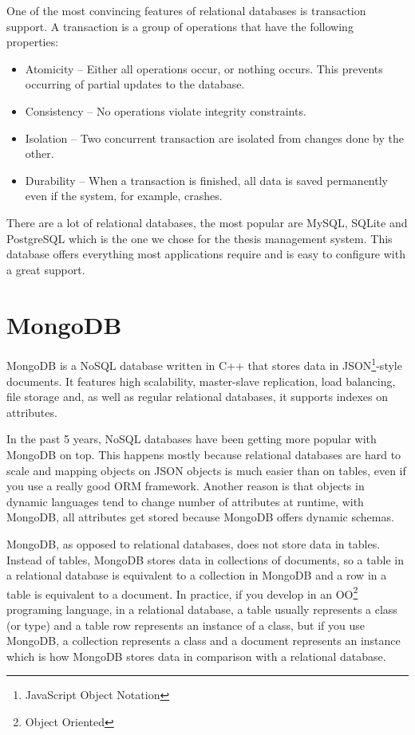 One of the most convincing features of relational databases is transaction support. A transaction is a group of operations that have the following properties:

\begin{itemize}
    \item Atomicity -- Either all operations occur, or nothing occurs. This prevents occurring of partial updates to the database.
    \item Consistency -- No operations violate integrity constraints.
    \item Isolation -- Two concurrent transaction are isolated from changes done by the other.
    \item Durability -- When a transaction is finished, all data is saved permanently even if the system, for example, crashes.
\end{itemize}

There are a lot of relational databases, the most popular are MySQL, SQLite and PostgreSQL which is the one we chose for the thesis management system. This database offers everything most applications require and is easy to configure with a great support.

\section{MongoDB}

MongoDB is a NoSQL database written in C++\cite{mongodb-homepage} that stores data in JSON\footnote{JavaScript Object Notation}-style documents. It features high scalability, master-slave replication, load balancing, file storage and, as well as regular relational databases, it supports indexes on attributes. 

In the past 5 years, NoSQL databases have been getting more popular with MongoDB on top\cite{db-ranking}. This happens mostly because relational databases are hard to scale and mapping objects on JSON objects is much easier than on tables, even if you use a really good ORM framework. Another reason is that objects in dynamic languages tend to change number of attributes at runtime, with MongoDB, all attributes get stored because MongoDB offers dynamic schemas.

MongoDB, as opposed to relational databases, does not store data in tables. Instead of tables, MongoDB stores data in collections of documents, so a table in a relational database is equivalent to a collection in MongoDB and a row in a table is equivalent to a document. In practice, if you develop in an OO\footnote{Object Oriented} programing language, in a relational database, a table usually represents a class (or type) and a table row represents an instance of a class, but if you use MongoDB, a collection represents a class and a document represents an instance which is how MongoDB stores data in comparison with a relational database.

